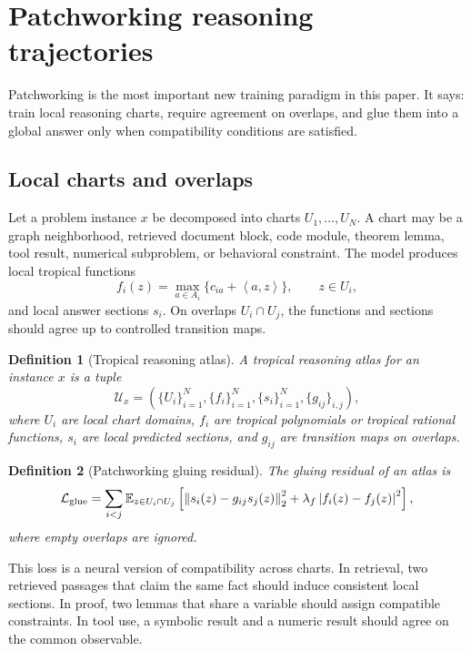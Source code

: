 \documentclass[11pt]{article}
\newtheorem{definition}{Definition}[section]
\newcommand{\E}{\mathbb{E}}
\newcommand{\calL}{\mathcal{L}}
\newcommand{\calU}{\mathcal{U}}
\newcommand{\norm}[1]{\left\lVert #1\right\rVert}
\newcommand{\abs}[1]{\left\lvert #1\right\rvert}
\newcommand{\ip}[2]{\left\langle #1,#2\right\rangle}
\begin{document}
\section{Patchworking reasoning trajectories}\label{sec:patchworking}

Patchworking is the most important new training paradigm in this paper.  It says: train local reasoning charts, require agreement on overlaps, and glue them into a global answer only when compatibility conditions are satisfied.

\subsection{Local charts and overlaps}

Let a problem instance \(x\) be decomposed into charts \(U_1,
\ldots,U_N\).  A chart may be a graph neighborhood, retrieved document block, code module, theorem lemma, tool result, numerical subproblem, or behavioral constraint.  The model produces local tropical functions
\begin{equation}
f_i(z)=\max_{a\in A_i}\{c_{ia}+\ip{a}{z}\},\qquad z\in U_i,
\end{equation}
and local answer sections \(s_i\).  On overlaps \(U_i\cap U_j\), the functions and sections should agree up to controlled transition maps.

\begin{definition}[Tropical reasoning atlas]
A tropical reasoning atlas for an instance \(x\) is a tuple
\begin{equation}
\calU_x=(\{U_i\}_{i=1}^N,\{f_i\}_{i=1}^N,\{s_i\}_{i=1}^N,\{g_{ij}\}_{i,j}),
\end{equation}
where \(U_i\) are local chart domains, \(f_i\) are tropical polynomials or tropical rational functions, \(s_i\) are local predicted sections, and \(g_{ij}\) are transition maps on overlaps.
\end{definition}

\begin{definition}[Patchworking gluing residual]
The gluing residual of an atlas is
\begin{equation}
\calL_{\rm glue}=\sum_{i<j}\E_{z\in U_i\cap U_j}\left[\norm{s_i(z)-g_{ij}s_j(z)}_2^2 + \lambda_f\abs{f_i(z)-f_j(z)}^2\right],
\end{equation}
where empty overlaps are ignored.
\end{definition}

This loss is a neural version of compatibility across charts.  In retrieval, two retrieved passages that claim the same fact should induce consistent local sections.  In proof, two lemmas that share a variable should assign compatible constraints.  In tool use, a symbolic result and a numeric result should agree on the common observable.
\end{document}
